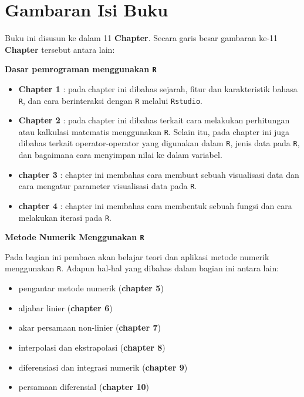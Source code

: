 \documentclass[]{book}
\providecommand{\tightlist}{%
  \setlength{\itemsep}{0pt}\setlength{\parskip}{0pt}}
\theoremstyle{definition}
\theoremstyle{definition}
\theoremstyle{definition}
\theoremstyle{remark}
\begin{document}
\hypertarget{gambaran-isi-buku}{%
\section*{Gambaran Isi Buku}\label{gambaran-isi-buku}}

Buku ini disusun ke dalam 11 \textbf{Chapter}. Secara garis besar gambaran ke-11 \textbf{Chapter} tersebut antara lain:

\textbf{Dasar pemrograman menggunakan \texttt{R}}

\begin{itemize}
\tightlist
\item
  \textbf{Chapter 1} : pada chapter ini dibahas sejarah, fitur dan karakteristik bahasa \texttt{R}, dan cara berinteraksi dengan \texttt{R} melalui \texttt{Rstudio}.
\item
  \textbf{Chapter 2} : pada chapter ini dibahas terkait cara melakukan perhitungan atau kalkulasi matematis menggunakan \texttt{R}. Selain itu, pada chapter ini juga dibahas terkait operator-operator yang digunakan dalam \texttt{R}, jenis data pada \texttt{R}, dan bagaimana cara menyimpan nilai ke dalam variabel.
\item
  \textbf{chapter 3} : chapter ini membahas cara membuat sebuah visualisasi data dan cara mengatur parameter visualisasi data pada \texttt{R}.
\item
  \textbf{chapter 4} : chapter ini membahas cara membentuk sebuah fungsi dan cara melakukan iterasi pada \texttt{R}.
\end{itemize}

\textbf{Metode Numerik Menggunakan \texttt{R}}

Pada bagian ini pembaca akan belajar teori dan aplikasi metode numerik menggunakan \texttt{R}. Adapun hal-hal yang dibahas dalam bagian ini antara lain:

\begin{itemize}
\tightlist
\item
  pengantar metode numerik (\textbf{chapter 5})
\item
  aljabar linier (\textbf{chapter 6})
\item
  akar persamaan non-linier (\textbf{chapter 7})
\item
  interpolasi dan ekstrapolasi (\textbf{chapter 8})
\item
  diferensiasi dan integrasi numerik (\textbf{chapter 9})
\item
  persamaan diferensial (\textbf{chapter 10})
\end{itemize}
\end{document}
